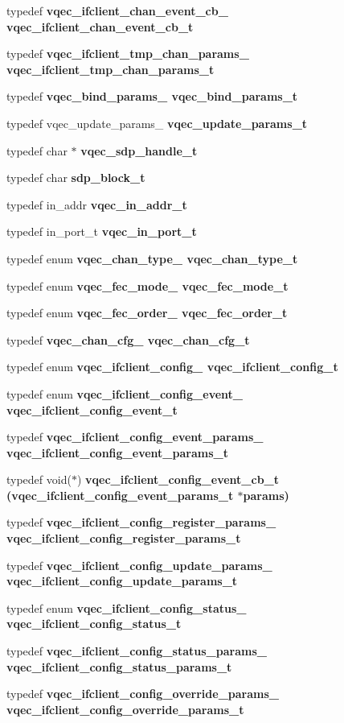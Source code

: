 \begin{CompactItemize}
\item 
typedef \bf{vqec\_\-ifclient\_\-chan\_\-event\_\-cb\_\-} \bf{vqec\_\-ifclient\_\-chan\_\-event\_\-cb\_\-t}
\item 
typedef \bf{vqec\_\-ifclient\_\-tmp\_\-chan\_\-params\_\-} \bf{vqec\_\-ifclient\_\-tmp\_\-chan\_\-params\_\-t}
\item 
typedef \bf{vqec\_\-bind\_\-params\_\-} \bf{vqec\_\-bind\_\-params\_\-t}
\item 
typedef vqec\_\-update\_\-params\_\- \bf{vqec\_\-update\_\-params\_\-t}
\item 
typedef char $\ast$ \bf{vqec\_\-sdp\_\-handle\_\-t}
\item 
typedef char \bf{sdp\_\-block\_\-t}
\item 
typedef in\_\-addr \bf{vqec\_\-in\_\-addr\_\-t}
\item 
typedef in\_\-port\_\-t \bf{vqec\_\-in\_\-port\_\-t}
\item 
typedef enum \bf{vqec\_\-chan\_\-type\_\-} \bf{vqec\_\-chan\_\-type\_\-t}
\item 
typedef enum \bf{vqec\_\-fec\_\-mode\_\-} \bf{vqec\_\-fec\_\-mode\_\-t}
\item 
typedef enum \bf{vqec\_\-fec\_\-order\_\-} \bf{vqec\_\-fec\_\-order\_\-t}
\item 
typedef \bf{vqec\_\-chan\_\-cfg\_\-} \bf{vqec\_\-chan\_\-cfg\_\-t}
\item 
typedef enum \bf{vqec\_\-ifclient\_\-config\_\-} \bf{vqec\_\-ifclient\_\-config\_\-t}
\item 
typedef enum \bf{vqec\_\-ifclient\_\-config\_\-event\_\-} \bf{vqec\_\-ifclient\_\-config\_\-event\_\-t}
\item 
typedef \bf{vqec\_\-ifclient\_\-config\_\-event\_\-params\_\-} \bf{vqec\_\-ifclient\_\-config\_\-event\_\-params\_\-t}
\item 
typedef void($\ast$) \bf{vqec\_\-ifclient\_\-config\_\-event\_\-cb\_\-t} (\bf{vqec\_\-ifclient\_\-config\_\-event\_\-params\_\-t} $\ast$params)
\item 
typedef \bf{vqec\_\-ifclient\_\-config\_\-register\_\-params\_\-} \bf{vqec\_\-ifclient\_\-config\_\-register\_\-params\_\-t}
\item 
typedef \bf{vqec\_\-ifclient\_\-config\_\-update\_\-params\_\-} \bf{vqec\_\-ifclient\_\-config\_\-update\_\-params\_\-t}
\item 
typedef enum \bf{vqec\_\-ifclient\_\-config\_\-status\_\-} \bf{vqec\_\-ifclient\_\-config\_\-status\_\-t}
\item 
typedef \bf{vqec\_\-ifclient\_\-config\_\-status\_\-params\_\-} \bf{vqec\_\-ifclient\_\-config\_\-status\_\-params\_\-t}
\item 
typedef \bf{vqec\_\-ifclient\_\-config\_\-override\_\-params\_\-} \bf{vqec\_\-ifclient\_\-config\_\-override\_\-params\_\-t}
\end{CompactItemize}
